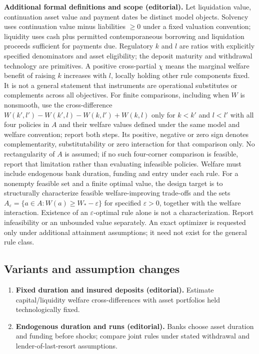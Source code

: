 \documentclass[11pt,a4paper]{article}
\begin{document}
\textbf{Additional formal definitions and scope (editorial).} Let liquidation value, continuation asset value and payment dates be distinct model objects. Solvency uses continuation value minus liabilities \(\geq0\) under a fixed valuation convention; liquidity uses cash plus permitted contemporaneous borrowing and liquidation proceeds sufficient for payments due. Regulatory \(k\) and \(l\) are ratios with explicitly specified denominators and asset eligibility; the deposit maturity and withdrawal technology are primitives. A positive cross-partial \(\chi\) means the marginal welfare benefit of raising \(k\) increases with \(l\), locally holding other rule components fixed. It is not a general statement that instruments are operational substitutes or complements across all objectives. For finite comparisons, including when \(W\) is nonsmooth, use the cross-difference \(W(k',l')-W(k',l)-W(k,l')+W(k,l)\) only for \(k<k'\) and \(l<l'\) with all four policies in \(A\) and their welfare values defined under the same model and welfare convention; report both steps. Its positive, negative or zero sign denotes complementarity, substitutability or zero interaction for that comparison only. No rectangularity of \(A\) is assumed; if no such four-corner comparison is feasible, report that limitation rather than evaluating infeasible policies. Welfare must include endogenous bank duration, funding and entry under each rule. For a nonempty feasible set and a finite optimal value, the design target is to structurally characterize feasible welfare-improving trade-offs and the sets \(A_\varepsilon=\{a\in A:W(a)\geq W_*-\varepsilon\}\) for specified \(\varepsilon>0\), together with the welfare interaction. Existence of an \(\varepsilon\)-optimal rule alone is not a characterization. Report infeasibility or an unbounded value separately. An exact optimizer is requested only under additional attainment assumptions; it need not exist for the general rule class.
\subsection*{Variants and assumption changes}
\begin{enumerate}
\item \textbf{Fixed duration and insured deposits (editorial).} Estimate capital/liquidity welfare cross-differences with asset portfolios held technologically fixed.
\item \textbf{Endogenous duration and runs (editorial).} Banks choose asset duration and funding before shocks; compare joint rules under stated withdrawal and lender-of-last-resort assumptions.
\end{enumerate}
\end{document}
